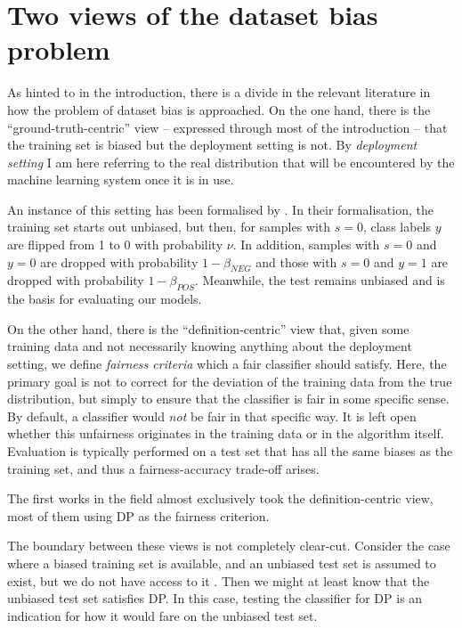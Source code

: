 \section{Two views of the dataset bias problem}\label{two-views-of-the-dataset-bias-problem}
As hinted to in the introduction,
there is a divide in the relevant literature in how the problem of dataset bias is approached.
On the one hand, there is the ``ground-truth-centric'' view -- expressed through most of the introduction --
that the training set is biased but the deployment setting is not.
By \emph{deployment setting} I am here referring to the real distribution
that will be encountered by the machine learning system once it is in use.


An instance of this setting has been formalised by \citet{blum2020recovering}.
In their formalisation, the training set starts out unbiased,
but then, for samples with \(s=0\), class labels \(y\) are flipped from 1 to 0 with probability \(\nu\).
In addition, samples with \(s=0\) and \(y=0\) are dropped with probability \(1-\beta_\mathit{NEG}\)
and those with \(s=0\) and \(y=1\) are dropped with probability \(1-\beta_\mathit{POS}\).
Meanwhile, the test remains unbiased and is the basis for evaluating our models.

On the other hand, there is the ``definition-centric'' view that,
given some training data and not necessarily knowing anything about the deployment setting,
we define \emph{fairness criteria} which a fair classifier should satisfy.
Here, the primary goal is not to correct for the deviation of the training data from the true distribution,
but simply to ensure that the classifier is fair in some specific sense.
By default, a classifier would \emph{not} be fair in that specific way.
It is left open whether this unfairness originates in the training data or in the algorithm itself.
Evaluation is typically performed on a test set that has all the same biases as the training set,
and thus a fairness-accuracy trade-off arises.

The first works in the field almost exclusively took the definition-centric view,
most of them using \acl{DP} \citep{dwork2012fairness} as the fairness criterion.

The boundary between these views is not completely clear-cut.
Consider the case where a biased training set is available,
and an unbiased test set is assumed to exist, but we do not have access to it \citep{jiang2020identifying}.
Then we might at least know that the unbiased test set satisfies \acf{DP}.
In this case, testing the classifier for \ac{DP} is an indication
for how it would fare on the unbiased test set.

